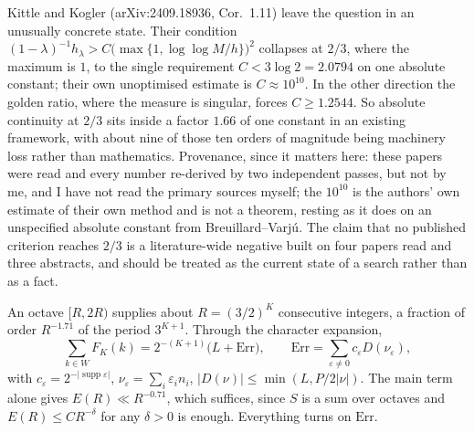 \documentclass[11pt]{article}
\theoremstyle{remark}
\newcommand{\lam}{\lambda}
\newcommand{\eps}{\varepsilon}
\DeclareMathOperator{\supp}{supp}
\begin{document}
Kittle and Kogler (arXiv:2409.18936, Cor.~1.11) leave the question in an unusually concrete state. Their
condition $(1-\lam)^{-1}h_\lam>C\bigl(\max\{1,\log\log M/h\}\bigr)^2$ collapses at $2/3$, where the
maximum is $1$, to the single requirement $C<3\log2=2.0794$ on one absolute constant; their own
unoptimised estimate is $C\approx10^{10}$. In the other direction the golden ratio, where the measure is
singular, forces $C\ge1.2544$. So absolute continuity at $2/3$ sits inside a factor $1.66$ of one
constant in an existing framework, with about nine of those ten orders of magnitude being machinery
loss rather than mathematics. Provenance, since it matters here: these papers were read and every number
re-derived by two independent passes, but not by me, and I have not read the primary sources myself; the
$10^{10}$ is the authors' own estimate of their own method and is not a theorem, resting as it does on an
unspecified absolute constant from Breuillard--Varj\'u. The claim that no published criterion reaches
$2/3$ is a literature-wide negative built on four papers read and three abstracts, and should be treated
as the current state of a search rather than as a fact.

An octave $[R,2R)$ supplies about $R=(3/2)^K$ consecutive integers, a fraction of order $R^{-1.71}$ of
the period $3^{K+1}$. Through the character expansion,
\begin{equation}\label{eq:err}
  \sum_{k\in W}F_K(k)=2^{-(K+1)}\bigl(L+\mathrm{Err}\bigr),\qquad
  \mathrm{Err}=\sum_{\eps\ne0}c_\eps D(\nu_\eps),
\end{equation}
with $c_\eps=2^{-|\supp\eps|}$, $\nu_\eps=\sum_i\eps_in_i$, $|D(\nu)|\le\min(L,P/2|\nu|)$. The main term
alone gives $E(R)\ll R^{-0.71}$, which suffices, since $S$ is a sum over octaves and
$E(R)\le CR^{-\delta}$ for any $\delta>0$ is enough. Everything turns on $\mathrm{Err}$.
\end{document}

